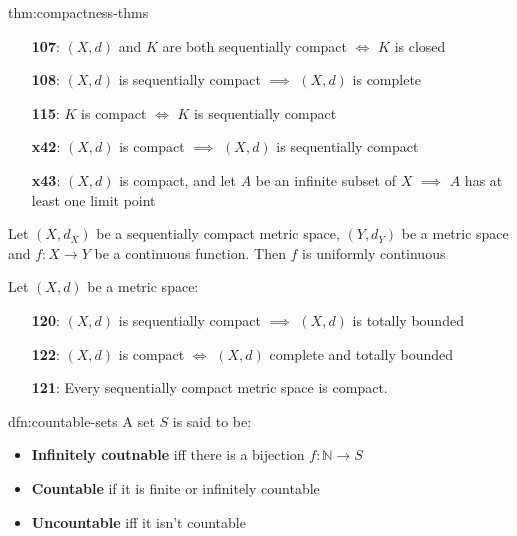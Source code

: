 \documentclass[landscape, 8pt]{extarticle}
\begin{document}
\begin{multicols}{3}
\begin{thm}{thm:compactness-thms}{}
\begin{itemize}[leftmargin=1.5em]
        \item[\textbf{107}:] $(X, d)$ and $K$ are both sequentially compact $\iff$ $K$ is closed

        \item[\textbf{108}:] $(X, d)$ is sequentially compact $\implies$ $(X, d)$ is complete

    \item[\textbf{115}:] $K$ is compact $\iff$ $K$ is sequentially compact

    \item[\textbf{x42}:] $(X, d)$ is compact $\implies$ $(X, d)$ is sequentially compact

    \item[\textbf{x43}:] $(X, d)$ is compact, and let $A$ be an infinite subset of $X$ $\implies$ $A$ has at least one limit point
    \end{itemize}

    \vspace{-5pt}
    \vspace{-2pt}

    Let $(X, d_{X})$ be a sequentially compact metric space, $(Y, d_{Y})$ be a metric space and $f : X\to Y$ be a continuous function. Then $f$ is uniformly continuous

    \vspace{-3pt}

    Let $(X, d)$ be a metric space:
    \vspace{-5pt}
    \begin{itemize}[leftmargin=1.5em]
        \item[\textbf{120}:] $(X, d)$ is sequentially compact $\implies$ $(X, d)$ is totally bounded
        \item[\textbf{122}:] $(X, d)$ is compact $\iff$ $(X, d)$ complete and totally bounded
        \item[\textbf{121}:] Every sequentially compact metric space is compact.
    \end{itemize}
\end{thm}

\newpage


\begin{dfn}{dfn:countable-sets}{}
    A set $S$ is said to be:
    \begin{itemize}
        \item \textbf{Infinitely coutnable} iff there is a bijection $f : \mathbb{N} \to S$
        \item \textbf{Countable} if it is finite or infinitely countable
        \item \textbf{Uncountable} iff it isn't countable
    \end{itemize}


\end{dfn}
\end{multicols}
\end{document}
